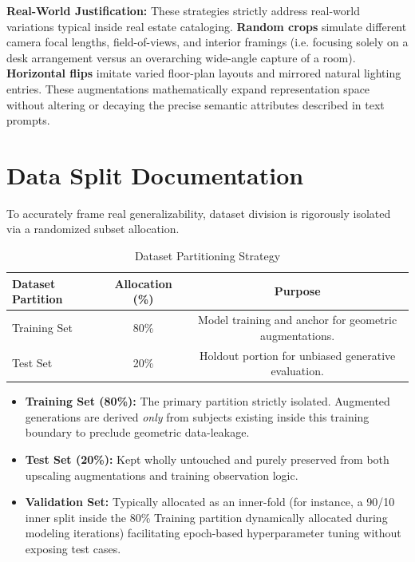 \documentclass[11pt, a4paper]{article}
\begin{document}
\textbf{Real-World Justification:} 
These strategies strictly address real-world variations typical inside real estate cataloging. \textbf{Random crops} simulate different camera focal lengths, field-of-views, and interior framings (i.e. focusing solely on a desk arrangement versus an overarching wide-angle capture of a room). \textbf{Horizontal flips} imitate varied floor-plan layouts and mirrored natural lighting entries. These augmentations mathematically expand representation space without altering or decaying the precise semantic attributes described in text prompts. 

\section{Data Split Documentation}
To accurately frame real generalizability, dataset division is rigorously isolated via a randomized subset allocation.

\begin{table}[h!]
    \centering
    \renewcommand{\arraystretch}{1.3}
    \begin{tabular}{@{}lcc@{}}
        \toprule
        \textbf{Dataset Partition} & \textbf{Allocation (\%)} & \textbf{Purpose} \\
        \midrule
        Training Set & 80\% & Model training and anchor for geometric augmentations. \\
        Test Set & 20\% & Holdout portion for unbiased generative evaluation. \\
        \bottomrule
    \end{tabular}
    \caption{Dataset Partitioning Strategy}
    \label{tab:data_split}
\end{table}

\begin{itemize}
    \item \textbf{Training Set (80\%):} The primary partition strictly isolated. Augmented generations are derived \textit{only} from subjects existing inside this training boundary to preclude geometric data-leakage.
    \item \textbf{Test Set (20\%):} Kept wholly untouched and purely preserved from both upscaling augmentations and training observation logic.
    \item \textbf{Validation Set:} Typically allocated as an inner-fold (for instance, a 90/10 inner split inside the 80\% Training partition dynamically allocated during modeling iterations) facilitating epoch-based hyperparameter tuning without exposing test cases.
\end{itemize}
\end{document}
